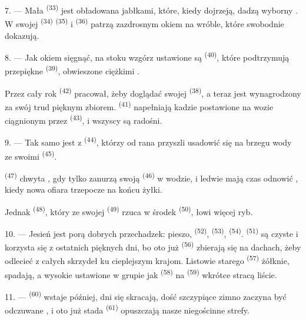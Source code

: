 7. --- Mała  \textsuperscript{(33)} jest obładowana jabłkami, które, kiedy
dojrzeją, dadzą wyborny . W swojej 
\textsuperscript{(34)}  \textsuperscript{(35)} i 
\textsuperscript{(36)} patrzą zazdrosnym okiem na wróble, które swobodnie dokazują.

8. --- Jak okiem sięgnąć, na stoku wzgórz ustawione są 
\textsuperscript{(40)}, które podtrzymują przepiękne 
\textsuperscript{(39)}, obwieszone ciężkimi .

Przez cały rok  \textsuperscript{(42)} pracował, żeby doglądać swojej
 \textsuperscript{(38)}, a teraz jest wynagrodzony za swój trud pięknym
zbiorem.  \textsuperscript{(41)} napełniają kadzie postawione na wozie
ciągnionym przez  \textsuperscript{(43)}, i wszyscy są radośni.

\VUsaut{5.0mm}
\VUsaut{3.4mm}

9. --- Tak samo jest z  \textsuperscript{(44)}, którzy od rana
przyszli usadowić się na brzegu wody ze swoimi 
\textsuperscript{(45)}.

 \textsuperscript{(47)} chwyta , gdy tylko zanurzą swoją
 \textsuperscript{(46)} w wodzie, i ledwie mają czas odnowić
, kiedy nowa ofiara trzepocze na końcu żyłki.

Jednak  \textsuperscript{(48)}, który ze swojej 
\textsuperscript{(49)} rzuca  w środek  \textsuperscript{(50)},
łowi więcej ryb.

10. --- Jesień jest porą dobrych przechadzek: pieszo, 
\textsuperscript{(52)},  \textsuperscript{(53)},
 \textsuperscript{(54)}.  \textsuperscript{(51)} są
czyste i korzysta się z ostatnich pięknych dni, bo oto już 
\textsuperscript{(56)} zbierają się na dachach, żeby odlecieć z całych skrzydeł ku
cieplejszym krajom. Listowie starego  \textsuperscript{(57)} żółknie,
 spadają, a wysokie  ustawione w grupie jak
 \textsuperscript{(58)} na  \textsuperscript{(59)}
wkrótce stracą liście.

11. ---  \textsuperscript{(60)} wstaje później, dni się skracają, dość
szczypiące zimno zaczyna być odczuwane , i oto już stada 
\textsuperscript{(61)} opuszczają nasze niegościnne strefy.
\VUsaut{6.0mm}
\VUfilet{22mm}
